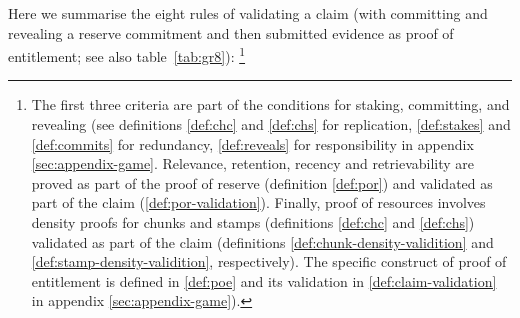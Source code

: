 Here we summarise the eight rules of validating a claim (with committing and revealing a reserve commitment and then submitted evidence as proof of entitlement; see also table~\ref{tab:gr8}):%
%
\footnote{The first three criteria are part of the conditions for staking, committing, and revealing (see definitions \ref{def:chc} and \ref{def:chs} for replication, \ref{def:stakes} and \ref{def:commits} for redundancy, \ref{def:reveals} for responsibility in appendix \ref{sec:appendix-game}. Relevance, retention, recency and  retrievability are proved as part of the proof of reserve (definition \ref{def:por}) and validated as part of the claim (\ref{def:por-validation}). Finally, proof of resources involves density proofs for chunks and stamps (definitions \ref{def:chc} and \ref{def:chs}) validated as part of the claim (definitions \ref{def:chunk-density-validition} and \ref{def:stamp-density-validition}, respectively). The specific construct of proof of entitlement is defined in \ref{def:poe} and its validation in \ref{def:claim-validation} in appendix \ref{sec:appendix-game}).}
%
